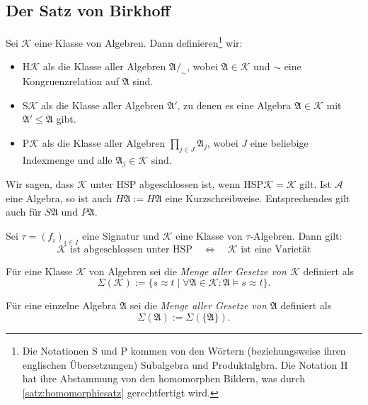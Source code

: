 
\subsection{Der Satz von Birkhoff}

\begin{samepage}    
\begin{definition}
    Sei $\mathcal{K}$ eine Klasse von Algebren. Dann definieren\footnote{Die Notationen \glqq S\grqq{} und \glqq{}P\grqq{} kommen von den Wörtern (beziehungsweise ihren englischen Übersetzungen) \glqq Subalgebra\grqq{} und \glqq Produktalgbra\grqq{}. Die Notation \glqq H\grqq{} hat ihre Abstammung von den \glqq homomorphen Bildern\grqq{}, was durch \cref{satz:homomorphiesatz} gerechtfertigt wird.} wir:
    \begin{itemize}
        \item $\mathrm{H}\mathcal{K}$ als die Klasse aller Algebren $\mathfrak{A /_\sim}$, wobei $\mathfrak{A} \in \mathcal{K}$ und $\sim$ eine Kongruenzrelation auf $\mathfrak{A}$ sind.
        \item $\mathrm{S}\mathcal{K}$ als die Klasse aller Algebren $\mathfrak{A}'$, zu denen es eine Algebra $\mathfrak{A} \in \mathcal{K}$ mit $\mathfrak{A}' \leq \mathfrak{A}$ gibt.
        \item $\mathrm{P}\mathcal{K}$ als die Klasse aller Algebren $\prod_{j \in J} \mathfrak{A}_j$, wobei $J$ eine beliebige Indexmenge und alle $\mathfrak{A}_j \in \mathcal{K}$ sind.
    \end{itemize}
    Wir sagen, dass $\mathcal{K}$ unter $\mathrm{HSP}$ abgeschlossen ist, wenn $\mathrm{HSP}\mathcal{K} = \mathcal{K}$ gilt. Ist $\mathcal{A}$ eine Algebra, so ist auch $H\mathfrak{A}:=H{\mathfrak{A}}$ eine Kurzschreibweise. Entsprechendes gilt auch für $S\mathfrak{A}$ und $P\mathfrak{A}$.
\end{definition}
\end{samepage}

\begin{theorem}[Birkhoff]\label{theorem:birkhoff}
    Sei $\tau=(f_i)_{i\in I}$ eine Signatur und $\mathcal{K}$ eine Klasse von $\tau$-Algebren. Dann gilt:
    \[\mathcal{K} \text{ ist abgeschlossen unter } \mathrm{HSP} \quad \Leftrightarrow \quad \mathcal{K} \text{ ist eine Varietät} \]
\end{theorem}

\begin{definition}
    Für eine Klasse $\mathcal{K}$ von Algebren sei die \emph{Menge aller Gesetze von $\mathcal{K}$} definiert als
    $$\Sigma(\mathcal{K}):=\{s\approx t\mid \forall \mathfrak{A}\in\mathcal{K}:\mathfrak{A}\models s\approx t\}.$$

    Für eine einzelne Algebra $\mathfrak{A}$ sei die \emph{Menge aller Gesetze von $\mathfrak{A}$} definiert als 
    $$\Sigma(\mathfrak{A}) := \Sigma(\{\mathfrak{A}\}).$$ 
\end{definition}


